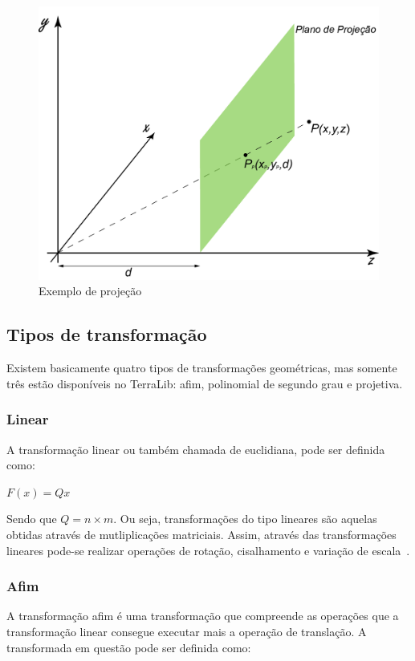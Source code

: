 \documentclass[9pt, a4paper, nofonttune, journal]{IEEEtran}
\begin{document}
\begin{figure}[H] 
\begin{center}
\includegraphics[scale=0.25]{figuras/projection1}
\caption{Exemplo de projeção}
\end{center}
\end{figure}

\subsection{Tipos de transformação}
Existem basicamente quatro tipos de transformações geométricas, mas somente três estão disponíveis no TerraLib:
afim, polinomial de segundo grau e projetiva.
\subsubsection{Linear}

A transformação linear ou também chamada de euclidiana, pode ser definida como:

\begin{center}
$F(x)=Qx$\end{center}
Sendo que $Q=n\times m$.
Ou seja, transformações do tipo lineares são aquelas obtidas através de mutliplicações matriciais.
Assim, através das transformações lineares pode-se realizar operações de rotação, cisalhamento e variação de escala~\cite{CGPPBook1}.

\subsubsection{Afim}
A transformação afim é uma transformação que compreende as operações que a transformação linear consegue executar mais a operação de translação. A transformada em questão pode ser definida como:
\end{document}
